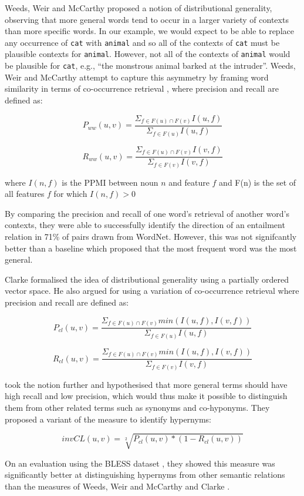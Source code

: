 \documentclass[11pt]{article}
\begin{document}
Weeds, Weir and McCarthy  proposed a notion of distributional generality, observing that more general words tend to occur in a larger variety of contexts than more specific words.  In our example, we would expect to be able to replace any occurrence of \texttt{cat} with \texttt{animal} and so all of the contexts of \texttt{cat} must be plausible contexts for \texttt{animal}.  However, not all of the contexts of \texttt{animal} would be plausible for \texttt{cat}, e.g., ``the monstrous animal barked at the intruder''.  Weeds, Weir and McCarthy attempt to capture this asymmetry by framing word similarity in terms of co-occurrence retrieval \cite{Weeds2003}, where precision and recall are defined as:

\[
P_{ww}(u,v) = \frac{\Sigma_{f \in F(u) \cap F(v)} I(u,f)}{\Sigma_{f \in F(u)} I(u,f)}
\]

\[
R_{ww}(u,v) = \frac{\Sigma_{f \in F(u) \cap F(v)} I(v,f)}{\Sigma_{f \in F(v)} I(v,f)}
\]

where $I(n,f)$ is the PPMI between noun $n$ and feature $f$ and F(n) is the set of all features $f$ for which $I(n,f)>0$

By comparing the precision and recall of one word's retrieval of another word's contexts, they were able to successfully identify the direction of an entailment relation in 71\% of pairs drawn from WordNet.  However, this was not signifcantly better than a baseline which proposed that the most frequent word was the most general.

Clarke  formalised the idea of distributional generality using a partially ordered vector space.  He also argued for using a variation of co-occurrence retrieval where precision and recall are defined as:

\[
P_{cl}(u,v) = \frac{\Sigma_{f \in F(u) \cap F(v)} min(I(u,f),I(v,f))}{\Sigma_{f \in F(u)} I(u,f)}
\]

\[
R_{cl}(u,v) = \frac{\Sigma_{f \in F(u) \cap F(v)} min(I(u,f),I(v,f))}{\Sigma_{f \in F(v)} I(v,f)}
\]

 took the notion further and hypothesised that more general terms should have high recall and low precision, which would thus make it possible to distinguish them from other related terms such as synonyms and co-hyponyms.  They proposed a variant of the  measure to identify hypernyms:

\[
invCL(u,v) = \sqrt[2]{P_{cl}(u,v)*(1-R_{cl}(u,v))}
\]

On an evaluation using the BLESS dataset \cite{Baroni2011}, they showed this measure was significantly better at distinguishing hypernyms from other semantic relations than the measures of Weeds, Weir and McCarthy  and Clarke .
\end{document}

